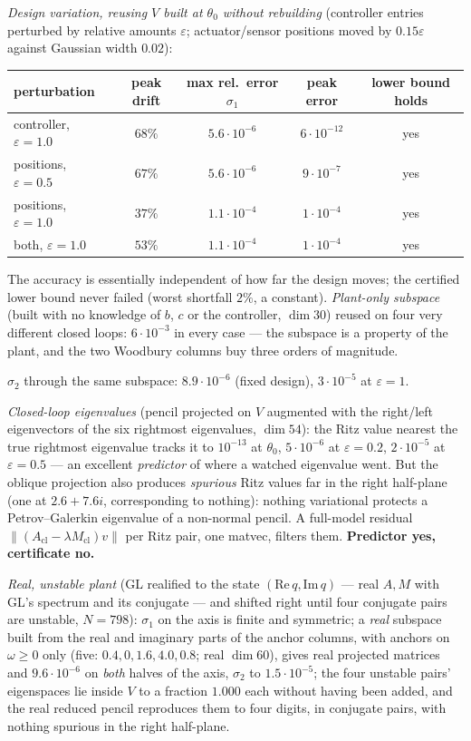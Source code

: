 \documentclass[11pt,a4paper]{article}
\newcommand{\Mcl}{M_{\mathrm{cl}}}
\newcommand{\Acl}{A_{\mathrm{cl}}}
\begin{document}
{{\emph{Design variation, reusing $V$ built at $\theta_0$ without rebuilding} (controller
entries perturbed by relative amounts $\varepsilon$; actuator/sensor positions moved by
$0.15\varepsilon$ against Gaussian width $0.02$):
\begin{center}\small
\begin{tabular}{lcccc}\toprule
perturbation & peak drift & max rel.\ error $\sigma_1$ & peak error & lower bound holds\\
\midrule
controller, $\varepsilon=1.0$ & $68\%$ & $5.6\cdot10^{-6}$ & $6\cdot10^{-12}$ & yes\\
positions, $\varepsilon=0.5$ & $67\%$ & $5.6\cdot10^{-6}$ & $9\cdot10^{-7}$ & yes\\
positions, $\varepsilon=1.0$ & $37\%$ & $1.1\cdot10^{-4}$ & $1\cdot10^{-4}$ & yes\\
both, $\varepsilon=1.0$ & $53\%$ & $1.1\cdot10^{-4}$ & $1\cdot10^{-4}$ & yes\\
\bottomrule\end{tabular}
\end{center}
The accuracy is essentially independent of how far the design moves; the certified lower
bound never failed (worst shortfall $2\%$, a constant).  \emph{Plant-only subspace}
(built with no knowledge of $b$, $c$ or the controller, $\dim30$) reused on four very
different closed loops: $6\cdot10^{-3}$ in every case --- the subspace is a property of
the plant, and the two Woodbury columns buy three orders of magnitude.

\emph{$\sigma_2$} through the same subspace: $8.9\cdot10^{-6}$ (fixed design),
$3\cdot10^{-5}$ at $\varepsilon=1$.

\emph{Closed-loop eigenvalues} (pencil projected on $V$ augmented with the right/left
eigenvectors of the six rightmost eigenvalues, $\dim54$): the Ritz value nearest the true
rightmost eigenvalue tracks it to $10^{-13}$ at $\theta_0$, $5\cdot10^{-6}$ at
$\varepsilon=0.2$, $2\cdot10^{-5}$ at $\varepsilon=0.5$ --- an excellent
\emph{predictor} of where a watched eigenvalue went.  But the oblique projection also
produces \emph{spurious} Ritz values far in the right half-plane (one at $2.6+7.6i$,
corresponding to nothing): nothing variational protects a Petrov--Galerkin eigenvalue of a
non-normal pencil.  A full-model residual $\|(\Acl-\lambda\Mcl)v\|$ per Ritz pair, one
matvec, filters them.  \textbf{Predictor yes, certificate no.}

\emph{Real, unstable plant} (GL realified to the state $(\mathrm{Re}\,q,\mathrm{Im}\,q)$
--- real $A,M$ with GL's spectrum and its conjugate --- and shifted right until four
conjugate pairs are unstable, $N=798$): $\sigma_1$ on the axis is finite and symmetric;
a \emph{real} subspace built from the real and imaginary parts of the anchor columns,
with anchors on $\omega\ge0$ only (five: $0.4,0,1.6,4.0,0.8$; real $\dim60$), gives real
projected matrices and $9.6\cdot10^{-6}$ on \emph{both} halves of the axis, $\sigma_2$ to
$1.5\cdot10^{-5}$; the four unstable pairs' eigenspaces lie inside $V$ to a fraction
$1.000$ each without having been added, and the real reduced pencil reproduces them to
four digits, in conjugate pairs, with nothing spurious in the right half-plane.

}}
\end{document}
